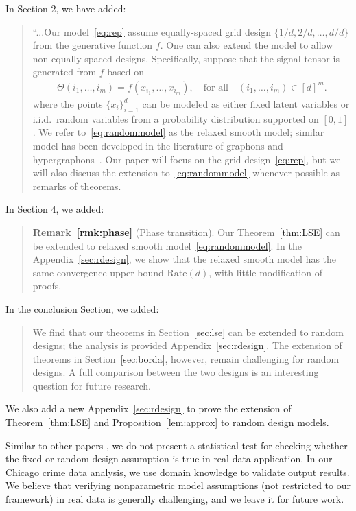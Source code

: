 \documentclass[11pt]{article}
\theoremstyle{plain}
\theoremstyle{definition}
\begin{document}
\begin{enumerate}[wide, labelwidth=!, labelindent=0pt]
In Section 2, we have added:
\begin{quote}
{\color{blue}``...Our model~\eqref{eq:rep} assume equally-spaced grid design $\{1/d,2/d,\ldots,d/d\}$ from the generative function $f$. One can also extend the model to allow non-equally-spaced designs. Specifically, suppose that the signal tensor is generated from $f$ based on 
\begin{align}\label{eq:randommodel}
\Theta(i_1,\ldots,i_m) = f(x_{i_1},\ldots,x_{i_m}), \quad \text{for all} \quad (i_1,\ldots,i_m)\in[d]^m. 
\end{align}
where the points $\{x_i\}_{i=1}^d$ can be modeled as either fixed latent variables or i.i.d.\ random variables from a probability distribution supported on $[0,1]$. We refer to~\eqref{eq:randommodel} as the relaxed smooth model; similar model has been developed in the literature of graphons and hypergraphons~\citep{chan2014consistent,gao2015rate,klopp2017oracle,balasubramanian2021nonparametric}. Our paper will focus on the grid design~\eqref{eq:rep}, but we will also discuss the extension to~\eqref{eq:randommodel} whenever possible as remarks of theorems.}      
\end{quote}

In Section 4, we added:
\begin{quote}
{\bf Remark~\ref{rmk:phase}} (Phase transition). {\color{blue} Our Theorem~\ref{thm:LSE} can be extended to relaxed smooth model~\eqref{eq:randommodel}. In the Appendix~\ref{sec:rdesign}, we show that the relaxed smooth model has the same convergence upper bound $\text{Rate}(d)$, with little modification of proofs.} 
\end{quote}

In the conclusion Section, we added:
\begin{quote}
 {\color{blue}We find that our theorems in Section~\ref{sec:lse} can be extended to random designs; the analysis is provided Appendix~\ref{sec:rdesign}. The extension of theorems in Section~\ref{sec:borda}, however, remain challenging for random designs. A full comparison between the two designs is an interesting question for future research.
 }
\end{quote}

We also add a new Appendix~\ref{sec:rdesign} to prove the extension of Theorem~\ref{thm:LSE} and Proposition~\ref{lem:approx} to random design models. 

Similar to other papers \citep{balasubramanian2021nonparametric,li2019nearest}, we do not present a statistical test for checking whether the fixed or random design assumption is true in real data application. In our Chicago crime data analysis, we use domain knowledge to validate output results. We believe that verifying nonparametric model assumptions (not restricted to our framework) in real data is generally challenging, and we leave it for future work. 
     

\end{enumerate}
\end{document}

